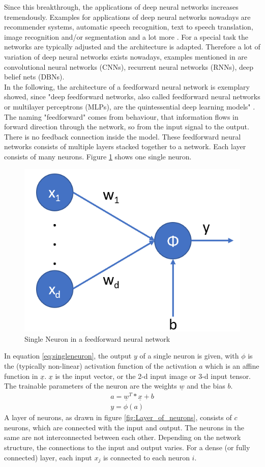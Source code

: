 \documentclass[12pt,DIV14,BCOR12mm,a4paper,footexclude,headinclude,halfparskip-,twoside,openright,openany,cleardoubleempty,idxtotoc,bibtotoc]{scrreprt} %
\numberwithin{equation}{chapter}
\begin{document}
Since this breakthrough, the applications of deep neural networks increases tremendously. Examples for applications of deep neural networks nowadays are recommender systems, automatic speech recognition, text to speech translation, image recognition and/or segmentation and a lot more \cite{DeepLearningDive}. For a special task the networks are typically adjusted and the architecture is adapted. Therefore a lot of variation of deep neural networks exists nowadays, examples mentioned in \cite{Nielsen-Michael} are convolutional neural networks (CNNs), recurrent neural networks (RNNs), deep belief nets (DBNs).\\
In the following, the architecture of a feedforward neural network is exemplary showed, since "deep feedforward networks, also called feedforward neural networks or multilayer perceptrons (MLPs), are the quintessential deep learning models" \cite{Goodfellow-et-al-2016}. The naming "feedforward" comes from behaviour, that information flows in forward direction through the network, so from the input signal to the output. There is no feedback connection inside the model. These feedforward neural networks consists of multiple layers stacked together to a network. Each layer consists of many neurons. Figure \ref{fig:SingleNeuron} shows one single neuron.
\begin{figure}[htb!]
	\centering
	\includegraphics[width=0.3\linewidth]{Graphiken/SingleNeuron}
	\caption{Single Neuron in a feedforward neural network}
	\label{fig:SingleNeuron}
\end{figure}
In equation \ref{eq:singleneuron}, the output $y$ of a single neuron is given, with $\phi$ is the (typically non-linear) activation function of the activation $a$ which is an affine function in $\underline{x}$. $\underline{x}$ is the input vector, or the 2-d input image or 3-d input tensor. The trainable parameters of the neuron are the weights $\underline{w}$ and the bias $b$.
\begin{align}
	a = \underline{w}{^T}*\underline{x}+b\\
	y = \phi(a) \label{eq:singleneuron}
\end{align}
A layer of neurons, as drawn in figure \ref{fig:Layer_of_neurons}, consists of $c$ neurons, which are connected with the input and output. The neurons in the same are not interconnected between each other. Depending on the network structure, the connections to the input and output varies. For a dense (or fully connected) layer, each input $x_{j}$ is connected to each neuron $i$.
\end{document}
